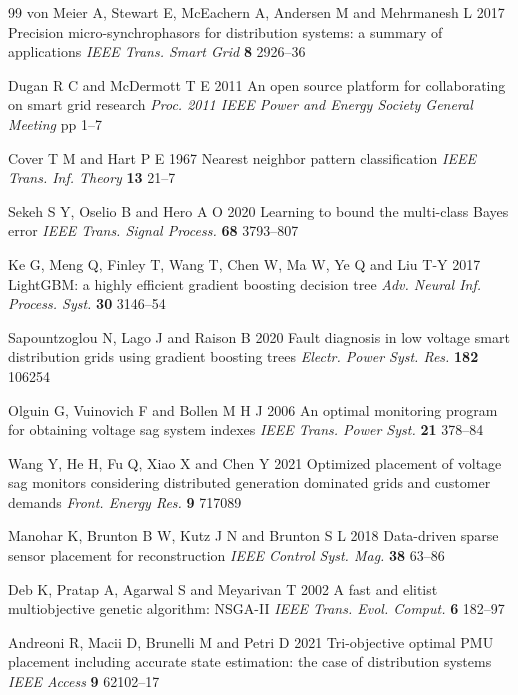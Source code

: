 \documentclass[11pt]{article}
\newcommand{\hlnew}[1]{#1}
\begin{document}
\begin{thebibliography}{99}
 \hlnew{von Meier A, Stewart E, McEachern A, Andersen M and Mehrmanesh L 2017 Precision micro-synchrophasors for distribution systems: a summary of applications \textit{IEEE Trans. Smart Grid} \textbf{8} 2926--36}

 Dugan R C and McDermott T E 2011 An open source platform for collaborating on smart grid research \textit{Proc. 2011 IEEE Power and Energy Society General Meeting} pp 1--7

 \hlnew{Cover T M and Hart P E 1967 Nearest neighbor pattern classification \textit{IEEE Trans. Inf. Theory} \textbf{13} 21--7}

 \hlnew{Sekeh S Y, Oselio B and Hero A O 2020 Learning to bound the multi-class Bayes error \textit{IEEE Trans. Signal Process.} \textbf{68} 3793--807}

 \hlnew{Ke G, Meng Q, Finley T, Wang T, Chen W, Ma W, Ye Q and Liu T-Y 2017 LightGBM: a highly efficient gradient boosting decision tree \textit{Adv. Neural Inf. Process. Syst.} \textbf{30} 3146--54}

 Sapountzoglou N, Lago J and Raison B 2020 Fault diagnosis in low voltage smart distribution grids using gradient boosting trees \textit{Electr. Power Syst. Res.} \textbf{182} 106254

 \hlnew{Olguin G, Vuinovich F and Bollen M H J 2006 An optimal monitoring program for obtaining voltage sag system indexes \textit{IEEE Trans. Power Syst.} \textbf{21} 378--84}

 \hlnew{Wang Y, He H, Fu Q, Xiao X and Chen Y 2021 Optimized placement of voltage sag monitors considering distributed generation dominated grids and customer demands \textit{Front. Energy Res.} \textbf{9} 717089}

 \hlnew{Manohar K, Brunton B W, Kutz J N and Brunton S L 2018 Data-driven sparse sensor placement for reconstruction \textit{IEEE Control Syst. Mag.} \textbf{38} 63--86}

 \hlnew{Deb K, Pratap A, Agarwal S and Meyarivan T 2002 A fast and elitist multiobjective genetic algorithm: NSGA-II \textit{IEEE Trans. Evol. Comput.} \textbf{6} 182--97}

 \hlnew{Andreoni R, Macii D, Brunelli M and Petri D 2021 Tri-objective optimal PMU placement including accurate state estimation: the case of distribution systems \textit{IEEE Access} \textbf{9} 62102--17}


\end{thebibliography}
\end{document}
